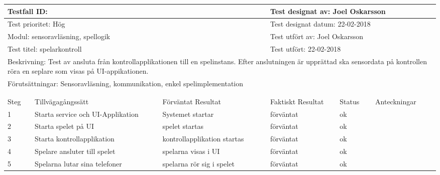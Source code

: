 \documentclass[10pt]{article}
\begin{document}
\begin{tabular}{| p{1cm}|  p{3cm} | p{3cm}| p{3cm}| p{2cm}| p{3cm}|}
  \hline
	\multicolumn{3}{|l|}{Testfall ID:}&\multicolumn{3}{|l|}{Test designat av: Joel Oskarsson}\\
	\hline
	\multicolumn{3}{|l|}{Test prioritet: Hög}&\multicolumn{3}{|l|}{Test designat datum: 22-02-2018}\\
	\hline
	\multicolumn{3}{|l|}{Modul: sensoravläsning, spellogik}&\multicolumn{3}{|l|}{Test utfört av: Joel Oskarsson}\\
	\hline
	\multicolumn{3}{|l|}{Test titel: spelarkontroll}&\multicolumn{3}{|l|}{Test utfört: 22-02-2018}\\
	\hline
	\multicolumn{6}{|p{\textwidth}|}{Beskrivning: Test av ansluta från kontrollapplikationen till en spelinstans. Efter anslutningen är upprättad ska sensordata på kontrollen röra en seplare som visas på UI-appikationen.}\\
	\hline
	\multicolumn{6}{|p{\textwidth}|}{Förutsättningar: Sensoravläsning, kommunikation, enkel spelimplementation}\\

	\hline
	\multicolumn{6}{|l|}{}\\
	\multicolumn{6}{|l|}{}\\
      	\hline
	Steg&Tillvägagångssätt&Förväntat Resultat&Faktiskt Resultat&Status&Anteckningar \\
	\hline
	1& Starta service och UI-Applikation & Systemet startar & förväntat & ok &\\
      	\hline
	2& Starta spelet på UI & spelet startas & förväntat & ok &\\
      	\hline
	3& Starta kontrollapplikation & kontrollapplikation startas & förväntat & ok &\\
      	\hline
  4& Spelare ansluter till spelet & spelarna visas i UI & förväntat & ok &\\
        \hline
  5& Spelarna lutar sina telefoner & spelarna rör sig i spelet & förväntat & ok &\\
      	\hline
\end{tabular}
\end{document}
